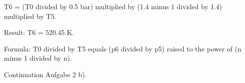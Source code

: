 T6 = (T0 divided by 0.5 bar) multiplied by (1.4 minus 1 divided by 1.4) multiplied by T5.  

Result: T6 = 520.45 K.  

Formula: T0 divided by T5 equals (p6 divided by p5) raised to the power of (n minus 1 divided by n).

Continuation Aufgabe 2 b).